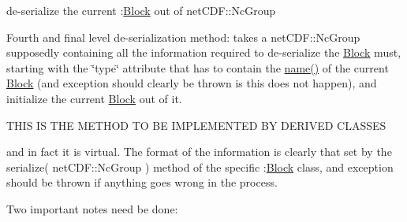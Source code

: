 de-\/serialize the current \+:\mbox{\hyperlink{class_s_m_spp__di__unipi__it_1_1_block}{Block}} out of net\+C\+D\+F\+::\+Nc\+Group 

Fourth and final level de-\/serialization method\+: takes a net\+C\+D\+F\+::\+Nc\+Group supposedly containing all the information required to de-\/serialize the \mbox{\hyperlink{class_s_m_spp__di__unipi__it_1_1_block}{Block}} must, starting with the \char`\"{}type\char`\"{} attribute that has to contain the \mbox{\hyperlink{class_s_m_spp__di__unipi__it_1_1_block_a738e9dfd6e00507da219e4bd5a3f6be9}{name()}} of the current \mbox{\hyperlink{class_s_m_spp__di__unipi__it_1_1_block}{Block}} (and exception should clearly be thrown is this does not happen), and initialize the current \mbox{\hyperlink{class_s_m_spp__di__unipi__it_1_1_block}{Block}} out of it. \begin{DoxyVerb} THIS IS THE METHOD TO BE IMPLEMENTED BY DERIVED CLASSES
\end{DoxyVerb}


and in fact it is virtual. The format of the information is clearly that set by the serialize( net\+C\+D\+F\+::\+Nc\+Group ) method of the specific \+:\mbox{\hyperlink{class_s_m_spp__di__unipi__it_1_1_block}{Block}} class, and exception should be thrown if anything goes wrong in the process.

Two important notes need be done\+:


